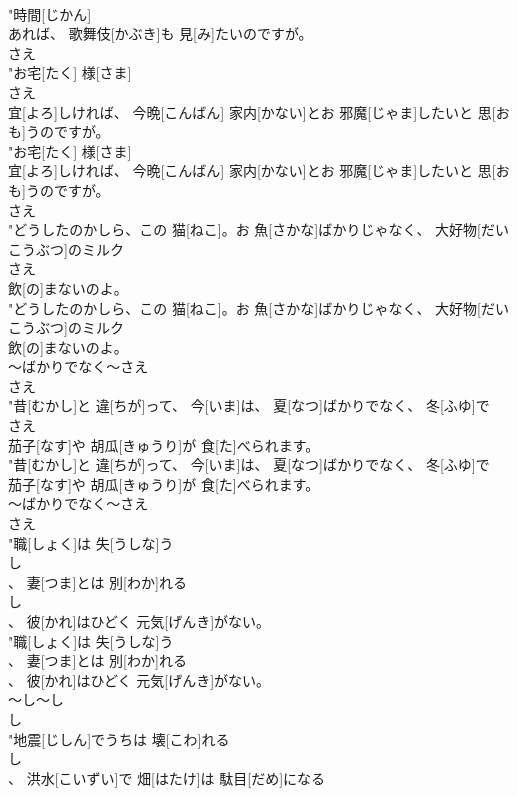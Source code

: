 \documentclass[8pt]{extreport}
\begin{document}
\begin{CJK}{UTF8}{min}
\\	"時間[じかん]
\\	あれば、 歌舞伎[かぶき]も 見[み]たいのですが。
\\	さえ
\\	"お宅[たく] 様[さま]
\\	さえ
\\	宜[よろ]しければ、 今晩[こんばん] 家内[かない]とお 邪魔[じゃま]したいと 思[おも]うのですが。
\\	"お宅[たく] 様[さま]
\\	宜[よろ]しければ、 今晩[こんばん] 家内[かない]とお 邪魔[じゃま]したいと 思[おも]うのですが。
\\	さえ
\\	"どうしたのかしら、この 猫[ねこ]。お 魚[さかな]ばかりじゃなく、 大好物[だいこうぶつ]のミルク
\\	さえ
\\	飲[の]まないのよ。
\\	"どうしたのかしら、この 猫[ねこ]。お 魚[さかな]ばかりじゃなく、 大好物[だいこうぶつ]のミルク
\\	飲[の]まないのよ。
\\	～ばかりでなく～さえ	
\\	さえ
\\	"昔[むかし]と 違[ちが]って、 今[いま]は、 夏[なつ]ばかりでなく、 冬[ふゆ]で
\\	さえ
\\	茄子[なす]や 胡瓜[きゅうり]が 食[た]べられます。
\\	"昔[むかし]と 違[ちが]って、 今[いま]は、 夏[なつ]ばかりでなく、 冬[ふゆ]で
\\	茄子[なす]や 胡瓜[きゅうり]が 食[た]べられます。
\\	～ばかりでなく～さえ	
\\	さえ
\\	"職[しょく]は 失[うしな]う
\\	し
\\	、 妻[つま]とは 別[わか]れる
\\	し
\\	、 彼[かれ]はひどく 元気[げんき]がない。
\\	"職[しょく]は 失[うしな]う
\\	、 妻[つま]とは 別[わか]れる
\\	、 彼[かれ]はひどく 元気[げんき]がない。
\\	～し～し 
\\	し
\\	"地震[じしん]でうちは 壊[こわ]れる
\\	し
\\	、 洪水[こいずい]で 畑[はたけ]は 駄目[だめ]になる

\end{CJK}
\end{document}
